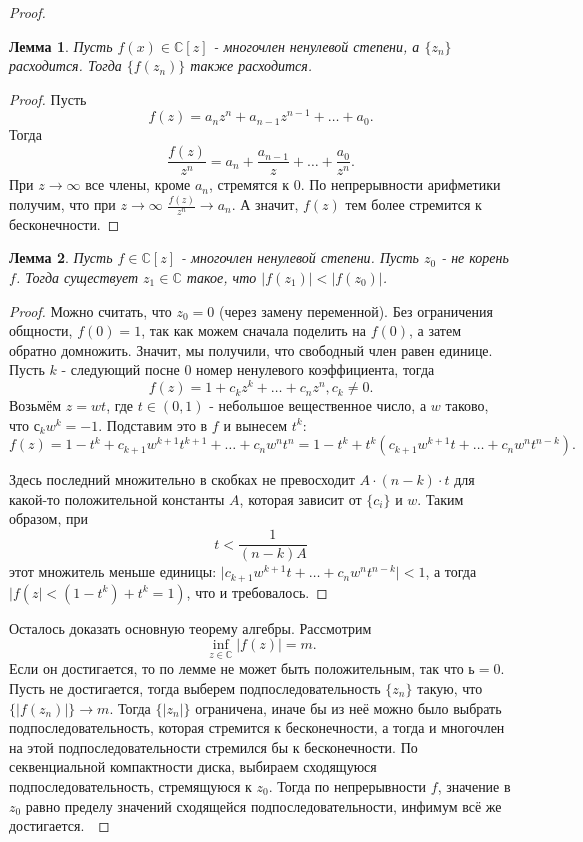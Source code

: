 \documentclass[a4paper,100pt]{article}
\theoremstyle{indented}
\newtheorem{lemma}{Лемма}
\theoremstyle{definition}
\theoremstyle{remark}
\begin{document}
\begin{proof}
    \begin{lemma}
        Пусть $f(x)\in\mathbb{C}[z]$ - многочлен ненулевой степени, а $\{z_n\}$ расходится. Тогда $\{f(z_n)\}$ также расходится.
    \end{lemma}

    \begin{proof}
        Пусть 
        \[
            f(z)=a_nz^n+a_{n-1}z^{n-1}+\dots+a_0.
        \]
        Тогда
        \[
            \frac{f(z)}{z^n}=a_n+\frac{a_{n-1}}{z}+\dots+\frac{a_0}{z^n}.
        \]
        При $z\rightarrow \infty$ все члены, кроме $a_n$, стремятся к 0. По непрерывности арифметики получим, что при $z\rightarrow \infty$ $\frac{f(z)}{z^n}\rightarrow a_n$. А значит, $f(z)$ тем более стремится к бесконечности.
    \end{proof}

    \begin{lemma}
        Пусть $f\in\mathbb{C}[z]$ - многочлен ненулевой степени. Пусть $z_0$ - не корень $f$. Тогда существует $z_1\in \mathbb{C}$ такое, что $\vert f(z_1)\vert <\vert f(z_0)\vert $.
    \end{lemma}

    \begin{proof}
        Можно считать, что $z_0=0$ (через замену переменной). Без ограничения общности, $f(0)=1$, так как можем сначала поделить на $f(0)$, а затем обратно домножить. Значит, мы получили, что свободный член равен единице.  Пусть $k$ - следующий посне 0 номер ненулевого коэффициента, тогда
        \[
            f(z)=1+c_kz^k+\dots+c_nz^n, c_k\neq 0.
        \]
        Возьмём $z=wt$, где $t\in (0,1)$ - небольшое вещественное число, а $w$ таково, что $с_kw^k=-1$. Подставим это в $f$ и вынесем $t^k$:
        \[
            f(z)=1-t^k+c_{k+1}w^{k+1}t^{k+1}+\dots+c_nw^nt^n=1-t^k+t^k(c_{k+1}w^{k+1}t+\dots+c_nw^nt^{n-k}).
        \]
    
        Здесь последний множительно в скобках не превосходит $A\cdot(n-k)\cdot t$ для какой-то положительной константы $A$, которая зависит от $\{c_i\}$ и $w$. Таким образом, при
        \[
            t<\frac{1}{(n-k)A}
        \]
        этот множитель меньше единицы: $\vert c_{k+1}w^{k+1}t+\dots+c_nw^{n}t^{n-k}\vert<1$, а тогда $\vert f(z\vert <(1-t^k)+t^k=1)$, что и требовалось.
    \end{proof}

    Осталось доказать основную теорему алгебры. Рассмотрим
    \[
        \inf_{z\in\mathbb{C}}\vert f(z)\vert = m.
    \]
    Если он достигается, то по лемме не может быть положительным, так что $ ь=0$. Пусть не достигается, тогда выберем подпоследовательность $\{z_n\}$ такую, что $\{\vert f(z_n)\vert\}\rightarrow m$. Тогда $\{\vert z_n\vert\}$ ограничена, иначе бы из неё можно было выбрать подпоследовательность, которая стремится к бесконечности, а тогда и многочлен на этой подпоследовательности стремился бы к бесконечности. По секвенциальной компактности диска, выбираем сходящуюся подпоследовательность, стремящуюся к $z_0$. Тогда по непрерывности $f$, значение в $z_0$ равно пределу значений сходящейся подпоследовательности, инфимум всё же достигается.\


\end{proof}
\end{document}
